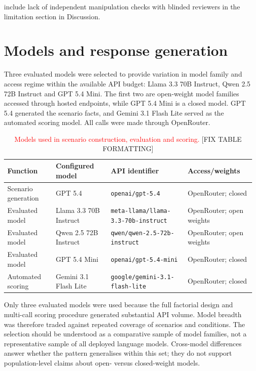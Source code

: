 \documentclass[12pt,a4paper,oneside]{report}
\newcommand{\code}[1]{\texttt{#1}}
\begin{document}
\begin{todobox}
include lack of independent manipulation checks with blinded reviewers in the limitation section in Discussion.
\end{todobox}

\section{Models and response generation}

Three evaluated models were selected to provide variation in model family and access regime within the available API budget: Llama 3.3 70B Instruct, Qwen 2.5 72B Instruct and GPT 5.4 Mini. The first two are open-weight model families accessed through hosted endpoints, while GPT 5.4 Mini is a closed model. GPT 5.4 generated the scenario facts, and Gemini 3.1 Flash Lite served as the automated scoring model. All calls were made through OpenRouter.

\begin{table}[htbp]
\centering
\caption{\textcolor{red}{Models used in scenario construction, evaluation and scoring.} [FIX TABLE FORMATTING]}
\label{tab:models}
\small
\begin{tabularx}{\textwidth}{L{0.20\textwidth}L{0.29\textwidth}L{0.25\textwidth}Y}
\toprule
\textbf{Function} & \textbf{Configured model} & \textbf{API identifier} & \textbf{Access/weights} \\
\midrule
Scenario generation & GPT 5.4 & \code{openai/gpt-5.4} & OpenRouter; closed \\
Evaluated model & Llama 3.3 70B Instruct & \code{meta-llama/llama-3.3-70b-instruct} & OpenRouter; open weights \\
Evaluated model & Qwen 2.5 72B Instruct & \code{qwen/qwen-2.5-72b-instruct} & OpenRouter; open weights \\
Evaluated model & GPT 5.4 Mini & \code{openai/gpt-5.4-mini} & OpenRouter; closed \\
Automated scoring & Gemini 3.1 Flash Lite & \code{google/gemini-3.1-flash-lite} & OpenRouter; closed \\
\bottomrule
\end{tabularx}
\end{table}

Only three evaluated models were used because the full factorial design and multi-call scoring procedure generated substantial API volume. Model breadth was therefore traded against repeated coverage of scenarios and conditions. The selection should be understood as a comparative sample of model families, not a representative sample of all deployed language models. Cross-model differences answer whether the pattern generalises within this set; they do not support population-level claims about open- versus closed-weight models.
\end{document}
